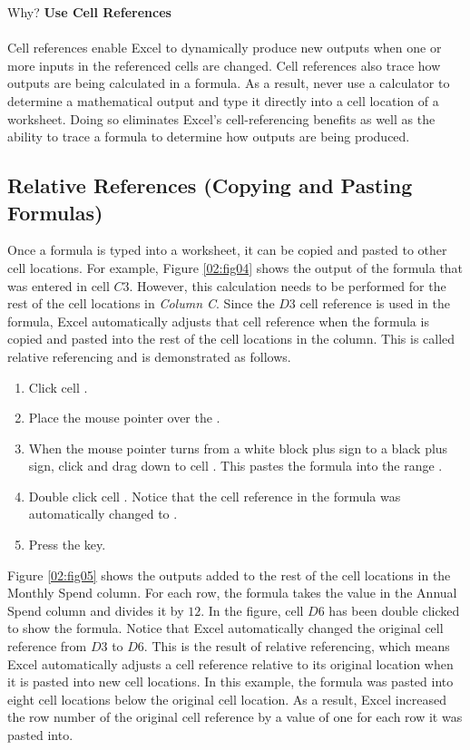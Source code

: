 \begin{center}
	\begin{infobox}{Why?}
		\textbf{Use Cell References}
		\\
		\\
		Cell references enable Excel to dynamically produce new outputs when one or more inputs in the referenced cells are changed. Cell references also trace how outputs are being calculated in a formula. As a result, never use a calculator to determine a mathematical output and type it directly into a cell location of a worksheet. Doing so eliminates Excel's cell-referencing benefits as well as the ability to trace a formula to determine how outputs are being produced.
	\end{infobox}
\end{center}

\subsection{Relative References (Copying and Pasting Formulas)}

Once a formula is typed into a worksheet, it can be copied and pasted to other cell locations. For example, Figure \ref{02:fig04} shows the output of the formula that was entered in cell $ C3 $. However, this calculation needs to be performed for the rest of the cell locations in \textit{Column C}. Since the $ D3 $ cell reference is used in the formula, Excel automatically adjusts that cell reference when the formula is copied and pasted into the rest of the cell locations in the column. This is called relative referencing and is demonstrated as follows.

\begin{enumerate}
	\item Click cell .
	\item Place the mouse pointer over the .
	\item When the mouse pointer turns from a white block plus sign to a black plus sign, click and drag down to cell . This pastes the formula into the range .
	\item Double click cell . Notice that the cell reference in the formula was automatically changed to .
	\item Press the  key.
\end{enumerate}

Figure \ref{02:fig05} shows the outputs added to the rest of the cell locations in the Monthly Spend column. For each row, the formula takes the value in the Annual Spend column and divides it by $ 12 $. In the figure, cell $ D6 $ has been double clicked to show the formula. Notice that Excel automatically changed the original cell reference from $ D3 $ to $ D6 $. This is the result of relative referencing, which means Excel automatically adjusts a cell reference relative to its original location when it is pasted into new cell locations. In this example, the formula was pasted into eight cell locations below the original cell location. As a result, Excel increased the row number of the original cell reference by a value of one for each row it was pasted into.

